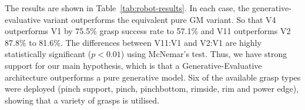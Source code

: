 The results are shown in Table~\ref{tab:robot-results}. In each case, the generative-evaluative variant outperforms the equivalent pure GM variant. So that V4 outperforms V1 by 75.5\% grasp success rate to 57.1\% and V11 outperforms V2 87.8\% to 81.6\%. The differences between V11:V1 and V2:V1 are highly statistically significant ($p<0.01$) using McNemar's test. Thus, we have strong support for our main hypothesis, which is that a Generative-Evaluative architecture outperforms a pure generative model. Six of the available grasp types were deployed (pinch support, pinch, pinchbottom, rimside, rim and power edge), showing that a variety of grasps is utilised.



